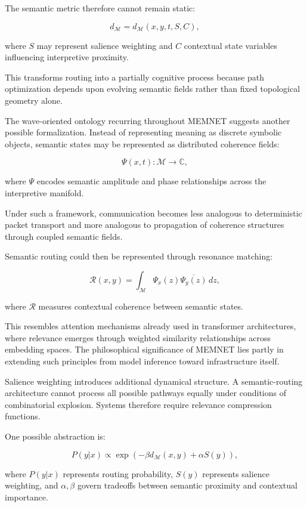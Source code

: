 \documentclass[11pt,a4paper]{article}
\begin{document}
The semantic metric therefore cannot remain static:

\[
d_{\mathcal{M}} = d_{\mathcal{M}}(x,y,t,S,C),
\]

where $S$ may represent salience weighting and $C$ contextual state variables influencing interpretive proximity.

This transforms routing into a partially cognitive process because path optimization depends upon evolving semantic fields rather than fixed topological geometry alone.

The wave-oriented ontology recurring throughout MEMNET suggests another possible formalization. Instead of representing meaning as discrete symbolic objects, semantic states may be represented as distributed coherence fields:

\[
\Psi(x,t) : \mathcal{M} \to \mathbb{C},
\]

where $\Psi$ encodes semantic amplitude and phase relationships across the interpretive manifold.

Under such a framework, communication becomes less analogous to deterministic packet transport and more analogous to propagation of coherence structures through coupled semantic fields.

Semantic routing could then be represented through resonance matching:

\[
\mathcal{R}(x,y) = \int_{\mathcal{M}} \Psi_x(z)\overline{\Psi_y(z)}\,dz,
\]

where $\mathcal{R}$ measures contextual coherence between semantic states.

This resembles attention mechanisms already used in transformer architectures, where relevance emerges through weighted similarity relationships across embedding spaces. The philosophical significance of MEMNET lies partly in extending such principles from model inference toward infrastructure itself.

Salience weighting introduces additional dynamical structure. A semantic-routing architecture cannot process all possible pathways equally under conditions of combinatorial explosion. Systems therefore require relevance compression functions.

One possible abstraction is:

\[
P(y|x) \propto \exp\left(-\beta d_{\mathcal{M}}(x,y) + \alpha S(y)\right),
\]

where $P(y|x)$ represents routing probability, $S(y)$ represents salience weighting, and $\alpha,\beta$ govern tradeoffs between semantic proximity and contextual importance.
\end{document}
